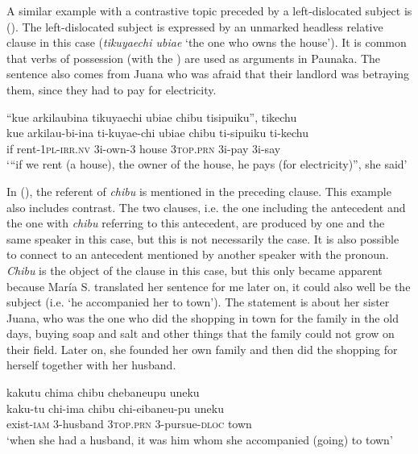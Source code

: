 \largerpage
A similar example with a contrastive topic preceded by a left-dislocated subject is (). The left-dislocated subject is expressed by an unmarked headless relative clause in this case (\textit{tikuyaechi ubiae} ‘the one who owns the house’). It is common that verbs of possession (with the ) are used as arguments in Paunaka. The sentence also comes from Juana who was afraid that their landlord was betraying them, since they had to pay for electricity.

\ea\label{ex:chibu-6}
\begingl
\glpreamble “kue arkilaubina tikuyaechi ubiae chibu tisipuiku”, tikechu\\
\gla kue arkilau-bi-ina ti-kuyae-chi ubiae chibu ti-sipuiku ti-kechu\\
\glb if rent-1\textsc{pl}-\textsc{irr.nv} 3i-own-3 house 3\textsc{top.prn} 3i-pay 3i-say\\
\glft ‘“if we rent (a house), the owner of the house, he pays (for electricity)”, she said’
\endgl
\trailingcitation{[jxx-p120430l-1.350]}
\xe

In (), the referent of \textit{chibu} is mentioned in the preceding clause. This example also includes contrast. The two clauses, i.e. the one including the antecedent and the one with \textit{chibu} referring to this antecedent, are produced by one and the same speaker in this case, but this is not necessarily the case. It is also possible to connect to an antecedent mentioned by another speaker with the pronoun. \textit{Chibu} is the object of the clause in this case, but this only became apparent because María S. translated her sentence for me later on, it could also well be the subject (i.e. ‘he accompanied her to town’). The statement is about her sister Juana, who was the one who did the shopping in town for the family in the old days, buying soap and salt and other things that the family could not grow on their field. Later on, she founded her own family and then did the shopping for herself together with her husband.

\ea\label{ex:chibu-7}
\begingl
\glpreamble kakutu chima chibu chebaneupu uneku\\
\gla kaku-tu chi-ima chibu chi-eibaneu-pu uneku\\
\glb exist-\textsc{iam} 3-husband 3\textsc{top.prn} 3-pursue-\textsc{dloc} town\\
\glft ‘when she had a husband, it was him whom she accompanied (going) to town’
\endgl
\trailingcitation{[rxx-p181101l-2.104]}
\xe

